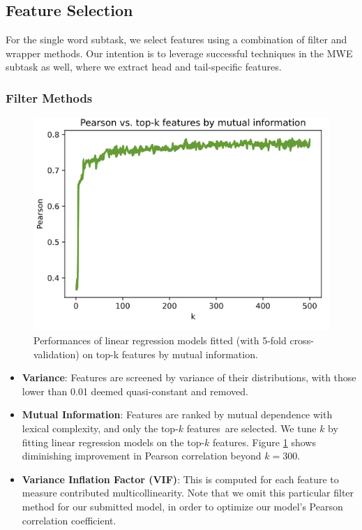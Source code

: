 \documentclass{dcthesis}
\theoremstyle{definition}
\theoremstyle{remark}
\begin{document}
\subsection{Feature Selection}

For the single word subtask, we select features using a combination of filter and wrapper methods. Our intention is to leverage successful techniques in the MWE subtask as well, where we extract head and tail-specific features.

\subsubsection{Filter Methods}

\begin{figure}
  \centering
  \includegraphics[scale=0.75]{mi.png}
  \caption{\label{fig:mi} Performances of linear regression models fitted (with 5-fold cross-validation) on top-k features by mutual information.}
\end{figure}

\begin{itemize}
  \item \textbf{Variance}: Features are screened by variance of their distributions, with those lower than 0.01 deemed quasi-constant and removed.
  \item \textbf{Mutual Information}: Features are ranked by mutual dependence with lexical complexity, and only the top-$k$ features are selected. We tune $k$ by fitting linear regression models on the top-$k$ features. Figure \ref{fig:mi} shows diminishing improvement in Pearson correlation beyond $k=300$.
  \item \textbf{Variance Inflation Factor (VIF)}: This is computed for each feature to measure contributed multicollinearity. Note that we omit this particular filter method for our submitted model, in order to optimize our model's Pearson correlation coefficient.
\end{itemize}
\end{document}
